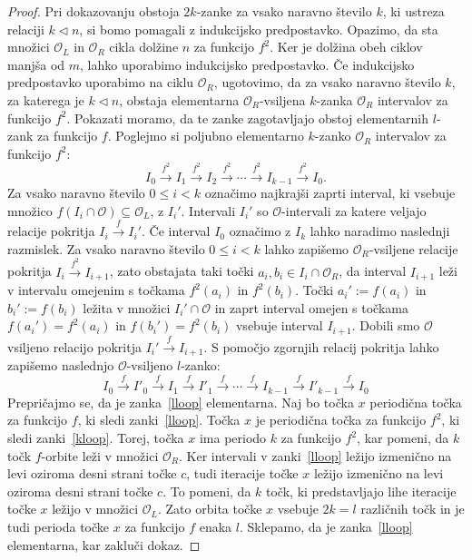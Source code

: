 \documentclass[mat2]{fmfdelo}
\begin{document}
\begin{proof}
Pri dokazovanju obstoja $2k$-zanke za vsako naravno število $k$, ki ustreza relaciji $k \triangleleft n$, si bomo pomagali z indukcijsko predpostavko. Opazimo, da sta množici $\mathcal{O}_L$ in $\mathcal{O}_R$  cikla dolžine $n$ za funkcijo $f^2$. Ker je dolžina obeh ciklov manjša od $m$, lahko uporabimo indukcijsko predpostavko. Če indukcijsko predpostavko uporabimo na ciklu $\mathcal{O}_R$, ugotovimo, da za vsako naravno število $k$, za katerega je $k \triangleleft n$, obstaja elementarna $\mathcal{O}_R$-vsiljena $k$-zanka $\mathcal{O}_R$ intervalov za funkcijo $f^2$. Pokazati moramo, da te zanke zagotavljajo obstoj elementarnih $l$-zank za funkcijo $f$. Poglejmo si poljubno elementarno $k$-zanko $\mathcal{O}_R$ intervalov za funkcijo $f^2$:
\begin{equation}\label{kloop}
I_0 \xrightarrow{f^2} I_1 \xrightarrow{f^2} I_2 \xrightarrow{f^2} \cdots \xrightarrow{f^2} I_{k-1} \xrightarrow{f^2} I_0.
\end{equation}
Za vsako naravno število $0 \leq i < k$ označimo najkrajši zaprti interval, ki vsebuje množico $f(I_i \cap \mathcal{O}) \subseteq \mathcal{O}_L$, z $I_i'$. Intervali $I_i'$ so $\mathcal{O}$-intervali za katere veljajo relacije pokritja $I_i \xrightarrow{f} I_i'$. Če interval $I_0$ označimo z $I_k$ lahko naradimo naslednji razmislek. Za vsako naravno število $0 \leq i < k$ lahko zapišemo $\mathcal{O}_R$-vsiljene relacije pokritja $I_i \xrightarrow{f^2} I_{i+1}$, zato obstajata taki točki $a_i, b_i \in I_i \cap \mathcal{O}_R$, da interval $I_{i+1}$ leži v intervalu omejenim s točkama $f^2(a_i)$ in $f^2(b_i)$. Točki $a_i' := f(a_i)$ in $b_i' := f(b_i)$ ležita v množici $I_i' \cap \mathcal{O}$ in zaprt interval omejen s točkama $f(a_i') = f^2(a_i)$ in $f(b_i') = f^2(b_i)$ vsebuje interval $I_{i+1}$. Dobili smo $\mathcal{O}$ vsiljeno relacijo pokritja $I_i' \xrightarrow{f} I_{i+1}$. S pomočjo zgornjih relacij pokritja lahko zapišemo naslednjo $\mathcal{O}$-vsiljeno $l$-zanko:
\begin{equation}\label{lloop}
I_0 \xrightarrow{f} I'_0 \xrightarrow{f} I_1 \xrightarrow{f} I'_1 \xrightarrow{f} \cdots \xrightarrow{f} I_{k-1} \xrightarrow{f} I'_{k-1} \xrightarrow{f} I_0
\end{equation}
Prepričajmo se, da je zanka~\eqref{lloop} elementarna. Naj bo točka $x$ periodična točka za funkcijo $f$, ki sledi zanki~\eqref{lloop}. Točka $x$ je periodična točka za funkcijo $f^2$, ki sledi zanki~\eqref{kloop}. Torej, točka $x$ ima periodo $k$ za funkcijo $f^2$, kar pomeni, da $k$ točk $f$-orbite leži v množici $\mathcal{O}_R$. Ker intervali v zanki~\eqref{lloop} ležijo izmenično na levi oziroma desni strani točke $c$, tudi iteracije točke $x$ ležijo izmenično na levi oziroma desni strani točke $c$. To pomeni, da $k$ točk, ki predstavljajo lihe iteracije točke $x$ ležijo v množici $\mathcal{O}_L$. Zato orbita točke $x$ vsebuje $2k = l$ različnih točk in je tudi perioda točke $x$ za funkcijo $f$ enaka $l$. Sklepamo, da je zanka~\eqref{lloop} elementarna, kar zakluči dokaz.
\end{proof}
\end{document}
